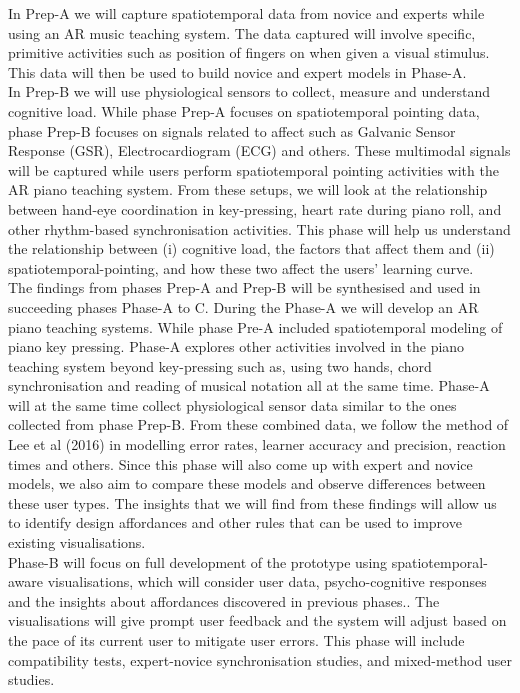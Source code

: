 \documentclass[manuscript,screen]{acmart}
\begin{document}
In Prep-A we will capture spatiotemporal data from novice and experts while using an AR music teaching system. The data captured will involve specific, primitive activities such as position of fingers on when given a visual stimulus. This data will then be used to build novice and expert models in Phase-A. \\

In Prep-B we will use physiological sensors to collect, measure and understand cognitive load. While phase Prep-A focuses on spatiotemporal pointing data, phase Prep-B focuses on signals related to affect such as Galvanic Sensor Response (GSR), Electrocardiogram (ECG) and others. These multimodal signals will be captured while users perform spatiotemporal pointing activities with the AR piano teaching system. From these setups, we will look at the relationship between hand-eye coordination in key-pressing, heart rate during piano roll, and other rhythm-based synchronisation activities. This phase will help us understand the relationship between (i) cognitive load, the factors that affect them and (ii) spatiotemporal-pointing, and how these two affect the users’ learning curve. \\

The findings from phases Prep-A and Prep-B will be synthesised and used in succeeding phases Phase-A to C. During the Phase-A  we will develop an AR piano teaching systems. While phase Pre-A included spatiotemporal modeling of piano key pressing. Phase-A explores other activities involved in the piano teaching system beyond key-pressing such as, using two hands, chord synchronisation and reading of musical notation all at the same time. Phase-A will at the same time collect physiological sensor data similar to the ones collected from phase Prep-B. From these combined data, we follow the method of Lee et al (2016) in modelling error rates, learner accuracy and precision, reaction times and others. Since this phase will also come up with expert and novice models, we also aim to compare these models and observe differences between these user types. The insights that we will find from these findings will allow us to identify design affordances and other rules that can be used to improve existing visualisations.\\

Phase-B will focus on full development of the prototype using spatiotemporal-aware visualisations, which will consider user data, psycho-cognitive responses and the insights about affordances discovered in previous phases.. The visualisations will give prompt user feedback and the system will adjust based on the pace of its current user to mitigate user errors. This phase will include compatibility tests, expert-novice synchronisation studies, and mixed-method user studies. \\
\end{document}
